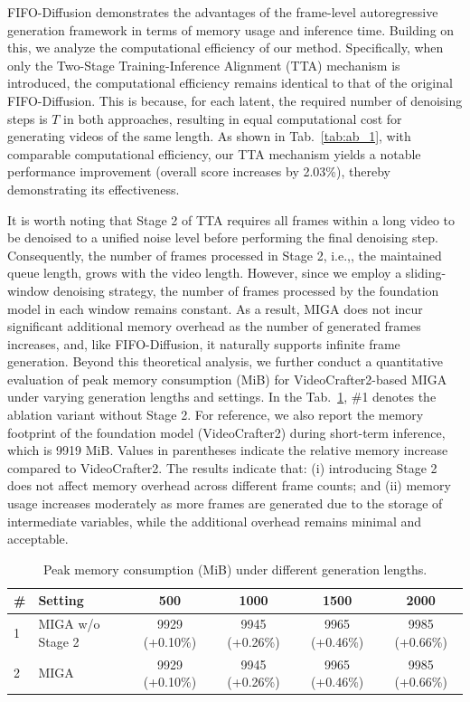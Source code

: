 \documentclass{llmxive}
\providecommand{\ie}{i.e.,\xspace}
\begin{document}
FIFO-Diffusion \cite{kim2024fifo} demonstrates the advantages of the frame-level autoregressive generation framework in terms of memory usage and inference time. Building on this, we analyze the computational efficiency of our method.
Specifically, when only the Two-Stage Training-Inference Alignment (TTA) mechanism is introduced, the computational efficiency remains identical to that of the original FIFO-Diffusion. This is because, for each latent, the required number of denoising steps is $T$ in both approaches, resulting in equal computational cost for generating videos of the same length.
As shown in Tab.~\ref{tab:ab_1}, with comparable computational efficiency, our TTA mechanism yields a notable performance improvement (overall score increases by 2.03\%), thereby demonstrating its effectiveness.

It is worth noting that Stage 2 of TTA requires all frames within a long video to be denoised to a unified noise level before performing the final denoising step. Consequently, the number of frames processed in Stage 2, \ie, the maintained queue length, grows with the video length. However, since we employ a sliding-window denoising strategy, the number of frames processed by the foundation model in each window remains constant. As a result, MIGA does not incur significant additional memory overhead as the number of generated frames increases, and, like FIFO-Diffusion, it naturally supports infinite frame generation. Beyond this theoretical analysis, we further conduct a quantitative evaluation of peak memory consumption (MiB) for VideoCrafter2-based MIGA under varying generation lengths and settings. In the Tab.~\ref{tab:memory_analysis}, \#1 denotes the ablation variant without Stage 2. For reference, we also report the memory footprint of the foundation model (VideoCrafter2) during short-term inference, which is 9919 MiB. Values in parentheses indicate the relative memory increase compared to VideoCrafter2. The results indicate that:
(i) introducing Stage 2 does not affect memory overhead across different frame counts; and
(ii) memory usage increases moderately as more frames are generated due to the storage of intermediate variables, while the additional overhead remains minimal and acceptable.



\begin{table}[htbp]
    \centering
    \small
    \begin{tabular}{l lcccc}
        \toprule
        \textbf{\#} & \textbf{Setting}  & \textbf{500} & \textbf{1000} & \textbf{1500} & \textbf{2000} \\
        \midrule
        1 & MIGA w/o Stage 2 & 9929 (+0.10\%) & 9945 (+0.26\%) & 9965 (+0.46\%) & 9985 (+0.66\%)  \\
        2 & MIGA             & 9929 (+0.10\%) & 9945 (+0.26\%) & 9965 (+0.46\%) & 9985 (+0.66\%)  \\
        \bottomrule
    \end{tabular}
\caption{Peak memory consumption (MiB) under different generation lengths.}
\label{tab:memory_analysis}
\end{table}
\end{document}
